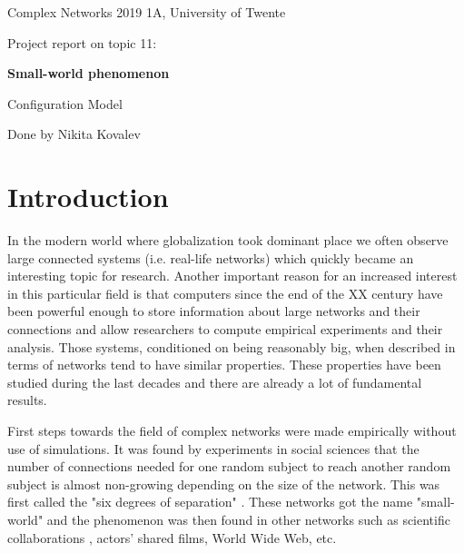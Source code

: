 \documentclass[a4paper]{article}
\renewcommand{\normalsize}{\fontsize{14}{16pt}\selectfont}
\renewcommand{\large}{\fontsize{17}{20pt}\selectfont}
\begin{document}
\normalsize

\thispagestyle{empty}
\begin{titlepage}

	\begin{center}
		\vfill
		Complex Networks 2019 1A, University of Twente
	\end{center}

\vspace{5cm}

	\begin{center}
		Project report on topic 11:
		
		{\large\bf Small-world phenomenon}
		
		{\large Configuration Model}	
	\end{center}

\vspace{3cm}

	\begin{center}
		Done by Nikita Kovalev
	\end{center}

\bigskip	
\vfill

\end{titlepage}

\tableofcontents
\newpage


\section{Introduction}


In the modern world where globalization took dominant place we often observe large connected systems (i.e. real-life networks) which quickly became an interesting topic for research. Another important reason for an increased interest in this particular field is that computers since the end of the XX century have been powerful enough to store information about large networks and their connections and allow researchers to compute empirical experiments and their analysis. Those systems, conditioned on being reasonably big, when described in terms of networks tend to have similar properties. These properties have been studied during the last decades and there are already a lot of fundamental results.

First steps towards the field of complex networks were made empirically without use of simulations. It was found by experiments in social sciences that the number of connections needed for one random subject to reach another random subject is almost non-growing depending on the size of the network. This was first called the "six degrees of separation" \cite{paper}. These networks got the name "small-world" and the phenomenon was then found in other networks such as scientific collaborations \cite{collab}, actors' shared films, World Wide Web, etc.
\end{document}
